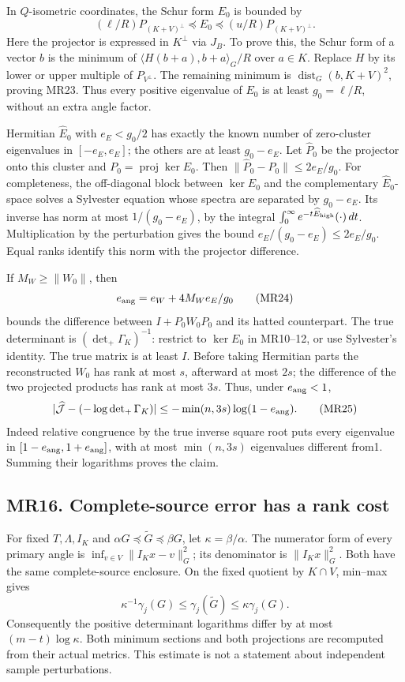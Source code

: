\documentclass[11pt]{article}
\begin{document}
In \(Q\)-isometric coordinates, the Schur form \(E_0\) is bounded by \[
 (\ell/R)P_{(K+V)^\perp}\preceq E_0
 \preceq (u/R)P_{(K+V)^\perp}.
\tag{MR23}
\] Here the projector is expressed in \(K^\perp\) via \(J_B\). To prove this, the Schur form of a vector \(b\) is the minimum of \(\langle H(b+a),b+a\rangle_G/R\) over \(a\in K\). Replace \(H\) by its lower or upper multiple of \(P_{V^\perp}\). The remaining minimum is \(\operatorname{dist}_G(b,K+V)^2\), proving MR23. Thus every positive eigenvalue of \(E_0\) is at least \(g_0=\ell/R\), without an extra angle factor.

Hermitian \(\widehat E_0\) with \(e_E<g_0/2\) has exactly the known number of zero-cluster eigenvalues in \([-e_E,e_E]\); the others are at least \(g_0-e_E\). Let \(\widehat P_0\) be the projector onto this cluster and \(P_0=\operatorname{proj}\ker E_0\). Then \(\|\widehat P_0-P_0\|\le2e_E/g_0\). For completeness, the off-diagonal block between \(\ker E_0\) and the complementary \(\widehat E_0\)-space solves a Sylvester equation whose spectra are separated by \(g_0-e_E\). Its inverse has norm at most \(1/(g_0-e_E)\), by the integral \(\int_0^\infty e^{-t\widehat E_{\rm high}}(\cdot)\,dt\). Multiplication by the perturbation gives the bound \(e_E/(g_0-e_E)\le2e_E/g_0\). Equal ranks identify this norm with the projector difference.

If \(M_W\ge\|W_0\|\), then \[
 e_{\rm ang}=e_W+4M_We_E/g_0
\tag{MR24}
\] bounds the difference between \(I+P_0W_0P_0\) and its hatted counterpart. The true determinant is \((\det_+\Gamma_K)^{-1}\): restrict to \(\ker E_0\) in MR10--12, or use Sylvester's identity. The true matrix is at least \(I\). Before taking Hermitian parts the reconstructed \(W_0\) has rank at most \(s\), afterward at most \(2s\); the difference of the two projected products has rank at most \(3s\). Thus, under \(e_{\rm ang}<1\), \[
 |\widehat{\mathcal J}-(-\log\det\nolimits_+\Gamma_K)|
 \le-\min(n,3s)\log(1-e_{\rm ang}).
\tag{MR25}
\] Indeed relative congruence by the true inverse square root puts every eigenvalue in \([1-e_{\rm ang},1+e_{\rm ang}]\), with at most \(\min(n,3s)\) eigenvalues different from1. Summing their logarithms proves the claim.

\subsection{MR16. Complete-source error has a rank cost}\label{mr16.-complete-source-error-has-a-rank-cost}

For fixed \(T,\Lambda,I_K\) and \(\alpha G\preceq\widetilde G\preceq\beta G\), let \(\kappa=\beta/\alpha\). The numerator form of every primary angle is \(\inf_{v\in V}\|I_Kx-v\|_G^2\); its denominator is \(\|I_Kx\|_G^2\). Both have the same complete-source enclosure. On the fixed quotient by \(K\cap V\), min--max gives \[
 \kappa^{-1}\gamma_j(G)\le\gamma_j(\widetilde G)\le\kappa\gamma_j(G).
\tag{MR26}
\] Consequently the positive determinant logarithms differ by at most \((m-t)\log\kappa\). Both minimum sections and both projections are recomputed from their actual metrics. This estimate is not a statement about independent sample perturbations.
\end{document}
